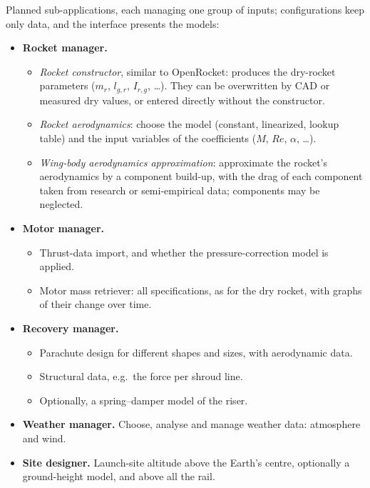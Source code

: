 Planned sub-applications, each managing one group of inputs; configurations keep only data, and the
interface presents the models:
\begin{itemize}
    \item \textbf{Rocket manager.}
    \begin{itemize}
        \item \emph{Rocket constructor}, similar to OpenRocket: produces the dry-rocket parameters
        ($m_r$, $l_{g,r}$, $I_{r,g}$, \dots). They can be overwritten by CAD or measured dry
        values, or entered directly without the constructor.
        \item \emph{Rocket aerodynamics}: choose the model (constant, linearized, lookup table)
        and the input variables of the coefficients ($M$, $Re$, $\alpha$, \dots).
        \item \emph{Wing-body aerodynamics approximation}: approximate the rocket's aerodynamics
        by a component build-up, with the drag of each component taken from research or
        semi-empirical data; components may be neglected.
    \end{itemize}
    \item \textbf{Motor manager.}
    \begin{itemize}
        \item Thrust-data import, and whether the pressure-correction model is applied.
        \item Motor mass retriever: all specifications, as for the dry rocket, with graphs of
        their change over time.
    \end{itemize}
    \item \textbf{Recovery manager.}
    \begin{itemize}
        \item Parachute design for different shapes and sizes, with aerodynamic data.
        \item Structural data, e.g.\ the force per shroud line.
        \item Optionally, a spring--damper model of the riser.
    \end{itemize}
    \item \textbf{Weather manager.} Choose, analyse and manage weather data: atmosphere and wind.
    \item \textbf{Site designer.} Launch-site altitude above the Earth's centre, optionally a
    ground-height model, and above all the rail.
\end{itemize}

